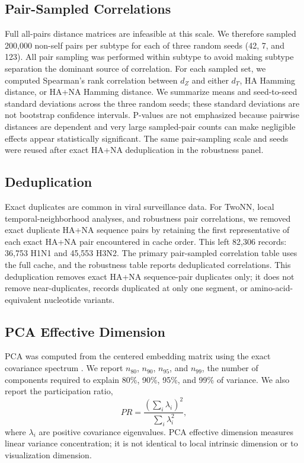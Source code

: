 \documentclass[11pt]{article}
\begin{document}
\subsection{Pair-Sampled Correlations}

Full all-pairs distance matrices are infeasible at this scale. We therefore sampled 200,000 non-self pairs per subtype for each of three random seeds (42, 7, and 123). All pair sampling was performed within subtype to avoid making subtype separation the dominant source of correlation. For each sampled set, we computed Spearman's rank correlation \cite{spearman1904} between $d_Z$ and either $d_T$, HA Hamming distance, or HA+NA Hamming distance. We summarize means and seed-to-seed standard deviations across the three random seeds; these standard deviations are not bootstrap confidence intervals. P-values are not emphasized because pairwise distances are dependent and very large sampled-pair counts can make negligible effects appear statistically significant. The same pair-sampling scale and seeds were reused after exact HA+NA deduplication in the robustness panel.

\subsection{Deduplication}

Exact duplicates are common in viral surveillance data. For TwoNN, local temporal-neighborhood analyses, and robustness pair correlations, we removed exact duplicate HA+NA sequence pairs by retaining the first representative of each exact HA+NA pair encountered in cache order. This left 82,306 records: 36,753 H1N1 and 45,553 H3N2. The primary pair-sampled correlation table uses the full cache, and the robustness table reports deduplicated correlations. This deduplication removes exact HA+NA sequence-pair duplicates only; it does not remove near-duplicates, records duplicated at only one segment, or amino-acid-equivalent nucleotide variants.

\subsection{PCA Effective Dimension}

PCA was computed from the centered embedding matrix using the exact covariance spectrum \cite{jolliffe2002pca,jolliffe2016pca}. We report $n_{80}$, $n_{90}$, $n_{95}$, and $n_{99}$, the number of components required to explain 80\%, 90\%, 95\%, and 99\% of variance. We also report the participation ratio,
\[
PR=\frac{(\sum_i\lambda_i)^2}{\sum_i\lambda_i^2},
\]
where $\lambda_i$ are positive covariance eigenvalues. PCA effective dimension measures linear variance concentration; it is not identical to local intrinsic dimension or to visualization dimension.
\end{document}
